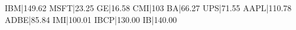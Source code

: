IBM|149.62
MSFT|23.25
GE|16.58
CMI|103
BA|66.27
UPS|71.55
AAPL|110.78
ADBE|85.84
IMI|100.01
IBCP|130.00
IB|140.00